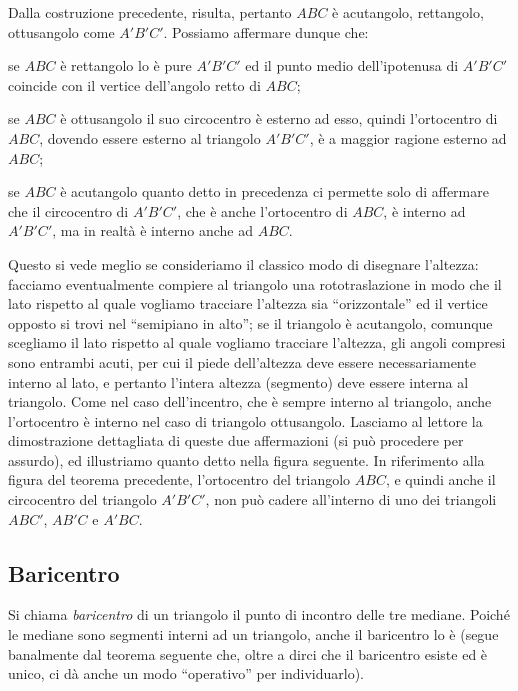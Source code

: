 \begin{osservazione}
Dalla costruzione precedente, risulta, pertanto $ABC$ è acutangolo, rettangolo, ottusangolo come $A'B'C'$. Possiamo affermare dunque che:
\begin{itemize*}
\item se $ABC$ è rettangolo lo è pure $A'B'C'$ ed il punto medio dell'ipotenusa di $A'B'C'$ coincide con il vertice dell'angolo retto di $ABC$;
\item se $ABC$ è ottusangolo il suo circocentro è esterno ad esso, quindi l'ortocentro di $ABC$, dovendo essere esterno al triangolo $A'B'C'$, è a maggior ragione esterno ad $ABC$;
\item se $ABC$ è acutangolo quanto detto in precedenza ci permette solo di affermare che il circocentro di $A'B'C'$, che è anche l'ortocentro di $ABC$, è interno ad $A'B'C'$, ma in realtà è interno anche ad $ABC$.
\end{itemize*}
Questo si vede meglio se consideriamo il classico modo di disegnare l'altezza: facciamo eventualmente compiere al triangolo una rototraslazione in modo che il lato rispetto al quale vogliamo tracciare l'altezza sia ``orizzontale'' ed il vertice opposto si trovi nel ``semipiano in alto''; se il triangolo è acutangolo, comunque scegliamo il lato rispetto al quale vogliamo tracciare l'altezza, gli angoli compresi sono entrambi acuti, per cui il piede dell'altezza deve essere necessariamente interno al lato, e pertanto l'intera altezza (segmento) deve essere interna al triangolo. Come nel caso dell'incentro, che è sempre interno al triangolo, anche l'ortocentro è interno nel caso di triangolo ottusangolo. Lasciamo al lettore la dimostrazione dettagliata di queste due affermazioni (si può procedere per assurdo), ed illustriamo quanto detto nella figura seguente.
In riferimento alla figura del teorema precedente, l'ortocentro del triangolo $ABC$, e quindi anche il circocentro del triangolo $A'B'C'$, non può cadere all'interno di uno dei triangoli $ABC'$, $AB'C$ e $A'BC$. 
\end{osservazione}

\subsection{Baricentro}

Si chiama \emph{baricentro} di un triangolo il punto di incontro delle tre mediane. Poiché le mediane sono segmenti interni ad un triangolo, anche il baricentro lo è (segue banalmente dal teorema seguente che, oltre a dirci che il baricentro esiste ed è unico, ci dà anche un modo ``operativo'' per individuarlo).

